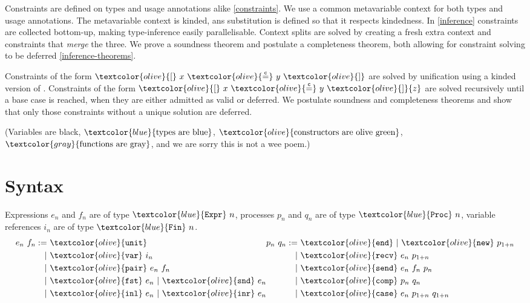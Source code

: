 \documentclass[sigplan,screen,review]{acmart}
\newcommand{\constr}[1]{\textcolor{olive}{\mathtt{#1}}}
\newcommand{\func}[1]{\textcolor{gray}{\mathtt{#1}}}
\newcommand{\type}[1]{\textcolor{blue}{\mathtt{#1}}}
\newcommand{\Fin}[1]{\type{Fin}~#1}
\newcommand{\sExpr}[1]{\type{Expr}~#1}
\newcommand{\sProc}[1]{\type{Proc}~#1}
\newcommand{\sunit}{\constr{unit}}
\newcommand{\svar}{\constr{var}}
\newcommand{\sfst}{\constr{fst}}
\newcommand{\ssnd}{\constr{snd}}
\newcommand{\sinl}{\constr{inl}}
\newcommand{\sinr}{\constr{inr}}
\newcommand{\spair}{\constr{pair}}
\newcommand{\send}{\constr{end}}
\newcommand{\snew}{\constr{new}}
\newcommand{\scomp}{\constr{comp}}
\newcommand{\srecv}{\constr{recv}}
\newcommand{\ssend}{\constr{send}}
\newcommand{\scase}{\constr{case}}
\newcommand{\eqconstr}[2]{\constr{[} ~ #1 ~ \constr{\stackrel{c}{=}} ~ #2 ~ \constr{]}}
\begin{document}
Constraints are defined on types and usage annotations alike \autoref{constraints}.
We use a common metavariable context for both types and usage annotations.
The metavariable context is kinded, ans substitution is defined so that it respects kindedness.
In \autoref{inference} constraints are collected bottom-up, making type-inference easily parallelisable.
Context splits are solved by creating a fresh extra context and constraints that \emph{merge} the three.
We prove a soundness theorem and postulate a completeness theorem, both allowing for constraint solving to be deferred \autoref{inference-theorems}.

Constraints of the form $\eqconstr{x}{y}$ are solved by unification using a kinded version of \cite{McBride03}.
Constraints of the form $\eqconstr{x}{y}{z}$ are solved recursively until a base case is reached, when they are either admitted as valid or deferred.
We postulate soundness and completeness theorems and show that only those constraints without a unique solution are deferred.

(Variables are black, $\type{\textrm{types are blue}}$, $\constr{\textrm{constructors are olive green}}$, $\func{\textrm{functions are gray}}$, and we are sorry this is not a wee poem.)


\section{Syntax}\label{syntax}

Expressions $e_n$ and $f_n$ are of type $\sExpr{n}$, processes $p_n$ and $q_n$ are of type $\sProc{n}$, variable references $i_n$ are of type $\Fin{n}$.
\[
\begin{aligned}[c]
  e_n ~ f_n  :=
  &~ \sunit \\
  |&~ \svar~i_n \\
  |&~ \spair~e_n~f_n \\
  |&~ \sfst~e_n ~|~  \ssnd~e_n \\
  |&~ \sinl~e_n ~|~  \sinr~e_n
\end{aligned}
\begin{aligned}[c]
  p_n ~ q_n  :=
  &~ \send ~|~  \snew~p_{1+n} \\
  |&~ \srecv~e_n~p_{1+n} \\
  |&~ \ssend~e_n~f_n~p_n \\
  |&~ \scomp~p_n~q_n \\
  |&~ \scase~e_n~p_{1+n}~q_{1+n}
\end{aligned}
\]
\end{document}
